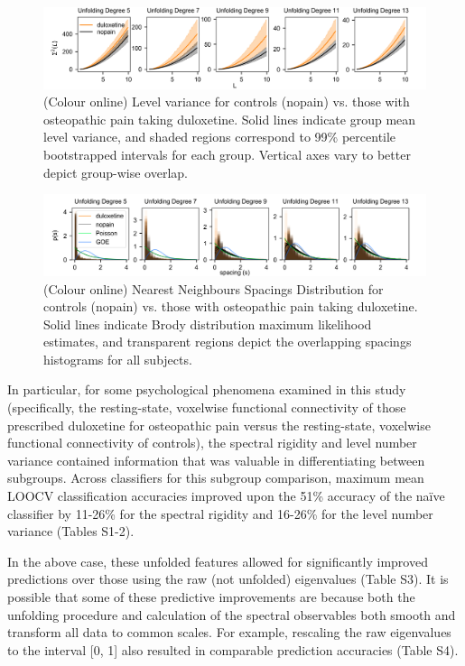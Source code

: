 \documentclass[NETN,manuscript]{stjour-new}
\begin{document}
\begin{figure}[ht]
\centerline{\includegraphics[width=\textwidth]{figure2}} \caption{
    (Colour online) Level variance for controls (nopain) vs. those with osteopathic pain taking
    duloxetine. Solid lines indicate group mean level variance, and shaded regions correspond to
    99\% percentile bootstrapped intervals for each group.  Vertical axes vary to better depict
    group-wise overlap.
}
\label{fig:levelvar}
\end{figure}

\begin{figure}[ht]
\centerline{\includegraphics[width=\textwidth]{figure3}} \caption{
    (Colour online) Nearest Neighbours Spacings Distribution for controls (nopain) vs. those with
    osteopathic pain taking duloxetine. Solid lines indicate Brody distribution maximum likelihood
    estimates, and transparent regions depict the overlapping spacings histograms for all subjects.
}
\label{fig:nnsd}
\end{figure}


In particular, for some psychological phenomena examined in this study (specifically, the
resting-state, voxelwise functional connectivity of those prescribed duloxetine for osteopathic pain
versus the resting-state, voxelwise functional connectivity of controls), the spectral rigidity and
level number variance contained information that was valuable in differentiating between subgroups.
Across classifiers for this subgroup comparison, maximum mean LOOCV classification accuracies
improved upon the 51\% accuracy of the naïve classifier by 11-26\% for the spectral rigidity and
16-26\% for the level number variance (Tables S1-2).

In the above case, these unfolded features allowed for significantly improved predictions over those
using the raw (not unfolded) eigenvalues (Table S3). It is possible that some of these predictive
improvements are because both the unfolding procedure and calculation of the spectral observables
both smooth and transform all data to common scales. For example,  rescaling the raw eigenvalues to
the interval [0, 1] also resulted in comparable prediction accuracies (Table S4).
\end{document}
